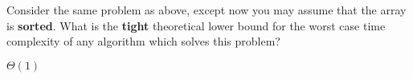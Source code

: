 \begin{prob}

    Consider the same problem as above, except now you may assume that the array
    is \textbf{sorted}. What is the \textbf{tight} theoretical lower bound for the worst
    case time complexity of any algorithm which solves this problem?

    \begin{soln}
        $\Theta(1)$
    \end{soln}

\end{prob}
